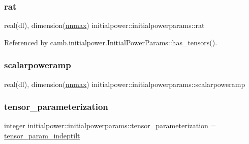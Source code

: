 \subsubsection{\texorpdfstring{rat}{rat}}
{\footnotesize\ttfamily real(dl), dimension(\mbox{\hyperlink{namespaceinitialpower_a9749c023ff83f7ffa2677dc578379c10}{nnmax}}) initialpower\+::initialpowerparams\+::rat\hspace{0.3cm}{\ttfamily [private]}}



Referenced by camb.\+initialpower.\+Initial\+Power\+Params\+::has\+\_\+tensors().

\mbox{\label{structinitialpower_1_1initialpowerparams_a091b0ac3914d98a48b9d2bfc0baad28f}} 
\subsubsection{\texorpdfstring{scalarpoweramp}{scalarpoweramp}}
{\footnotesize\ttfamily real(dl), dimension(\mbox{\hyperlink{namespaceinitialpower_a9749c023ff83f7ffa2677dc578379c10}{nnmax}}) initialpower\+::initialpowerparams\+::scalarpoweramp\hspace{0.3cm}{\ttfamily [private]}}

\mbox{\label{structinitialpower_1_1initialpowerparams_a8b40fb8380a1b6d7cf9b1cf75484a7ab}} 
\subsubsection{\texorpdfstring{tensor\+\_\+parameterization}{tensor\_parameterization}}
{\footnotesize\ttfamily integer initialpower\+::initialpowerparams\+::tensor\+\_\+parameterization = \mbox{\hyperlink{namespaceinitialpower_a08c3c750bc5c8657967d99b3f0b9585e}{tensor\+\_\+param\+\_\+indeptilt}}\hspace{0.3cm}{\ttfamily [private]}}

